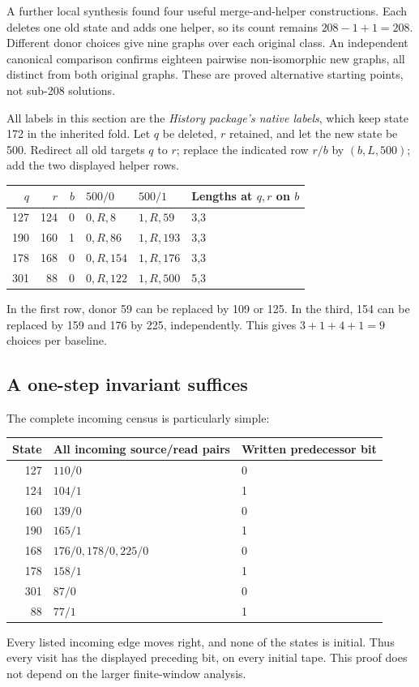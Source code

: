 \documentclass[11pt,a4paper]{article}
\begin{document}
A further local synthesis found four useful merge-and-helper constructions.
Each deletes one old state and adds one helper, so its count remains
$208-1+1=208$. Different donor choices give nine graphs over each original
class. An independent canonical comparison confirms eighteen pairwise
non-isomorphic new graphs, all distinct from both original graphs.
These are proved alternative starting points, not sub-208 solutions.

All labels in this section are the \emph{History package's native labels},
which keep state 172 in the inherited fold. Let $q$ be deleted, $r$ retained,
and let the new state be 500. Redirect all old targets $q$ to $r$; replace
the indicated row $r/b$ by $(b,L,500)$; add the two displayed helper rows.

\begin{center}\small
\begin{tabular}{@{}rrrlll@{}}
\toprule
$q$ & $r$ & $b$ & $500/0$ & $500/1$ & Lengths at $q,r$ on $b$\\
\midrule
127 &124&0&$0,R,8$ &$1,R,59$ &3,3\\
190 &160&1&$0,R,86$&$1,R,193$&3,3\\
178 &168&0&$0,R,154$&$1,R,176$&3,3\\
301 &88 &0&$0,R,122$&$1,R,500$&5,3\\
\bottomrule
\end{tabular}
\end{center}
In the first row, donor 59 can be replaced by 109 or 125. In the third,
154 can be replaced by 159 and 176 by 225, independently. This gives
$3+1+4+1=9$ choices per baseline.

\subsection{A one-step invariant suffices}

The complete incoming census is particularly simple:
\begin{center}\small
\begin{tabular}{@{}rll@{}}
\toprule
State & All incoming source/read pairs & Written predecessor bit\\
\midrule
127 & $110/0$ &0\\
124 & $104/1$ &1\\
160 & $139/0$ &0\\
190 & $165/1$ &1\\
168 & $176/0,178/0,225/0$ &0\\
178 & $158/1$ &1\\
301 & $87/0$ &0\\
88 & $77/1$ &1\\
\bottomrule
\end{tabular}
\end{center}
Every listed incoming edge moves right, and none of the states is initial.
Thus every visit has the displayed preceding bit, on every initial tape.
This proof does not depend on the larger finite-window analysis.
\end{document}

